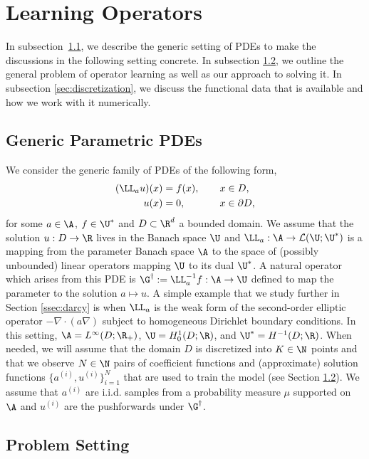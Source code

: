 
\section{Learning Operators}
\label{sec:setting}
In subsection~\ref{sec:genericPDE}, we describe the generic setting of PDEs to make the discussions in the following setting concrete.
In subsection \ref{sec:PS}, we outline the general problem of operator learning as well as our approach to solving it. In subsection \ref{sec:discretization}, we discuss the functional data that is available and how we work with it numerically.


\subsection{Generic Parametric PDEs}
\label{sec:genericPDE}
We consider the generic family of PDEs of the following form,
 \begin{align}
\label{eq:generalpde0}
\begin{split}
(\LL_a u)(x) &= f(x), \qquad x \in D, \\
u(x) &= 0, \qquad \quad \:\: x \in \partial D,
\end{split}
\end{align}
for some \(a \in \A\), \(f \in \U^*\) and \(D \subset \R^d\) a bounded domain. We assume that the solution \(u: D \to \R\) lives in the Banach space \(\U\) and  \(\LL_{a}: \A \to \mathcal{L}(\U; \U^*)\) is a mapping from the parameter Banach space \(\A\) to the space of (possibly unbounded) linear operators mapping \(\U\) to its dual \(\U^*\). A natural operator which arises from this PDE is \(\G^\dagger:= \LL_{a}^{-1}f : \A \to \U\) defined to map the parameter to the solution \(a \mapsto u\). A simple example that we study further in Section \ref{ssec:darcy} is when \(\LL_a\) is the weak form of the second-order elliptic operator  \(-\nabla \cdot (a \nabla)\) subject to homogeneous Dirichlet
boundary conditions. In this setting, \(\A = L^\infty(D;\R_+)\), \(\U = H^1_0(D;\R)\), and \(\U^* = H^{-1}(D;\R)\). When needed, we will assume that the domain $D$ is discretized into $K \in \N$ points 
and that we observe $N \in \N$ pairs of coefficient functions and (approximate) solution functions \(\{a^{(i)}, u^{(i)}\}_{i=1}^N\) that are used to train the model (see Section \ref{sec:PS}). We assume that \(a^{(i)}\) are i.i.d. samples from a probability measure \(\mu\) supported on \(\A\) and \(u^{(i)}\) are the pushforwards under \(\G^\dagger\).

\subsection{Problem Setting}
\label{sec:PS}

